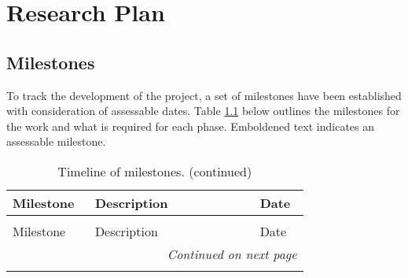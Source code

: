 \chapter[Milestones]{Research Plan}

\label{Chap:Milestones}

\section{Milestones}
To track the development of the project, a set of milestones have been established with consideration of assessable dates. 
Table \ref{tab:milestones} below outlines the milestones for the work and what is required for each phase.
Emboldened text indicates an assessable milestone.


\begin{center}
    \small
    \begin{longtable}{p{0.25\linewidth}p{0.5\linewidth}p{0.15\linewidth}}
        \caption{Timeline of milestones.} \label{tab:milestones} \\
        \toprule
        Milestone & Description & Date \\
        \midrule
        \endfirsthead
        
        \caption{Timeline of milestones. (continued)} \\
        \toprule
        Milestone & Description & Date \\
        \midrule
        \endhead
        
        \bottomrule
        \multicolumn{3}{r}{\textit{Continued on next page}} \\
        \endfoot
        
        \bottomrule
        \endlastfoot
        

\end{longtable}
\end{center}
